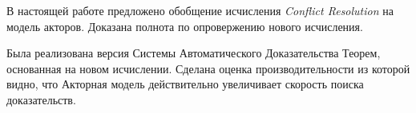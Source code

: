 
\startconclusionpage

В настоящей работе предложено обобщение исчисления \emph{Conflict Resolution} на модель акторов. Доказана полнота по опровержению нового исчисления. 

Была реализована версия Системы Автоматического Доказательства Теорем, основанная на новом исчислении. Сделана оценка производительности из которой видно, что Акторная модель действительно увеличивает скорость поиска доказательств.



